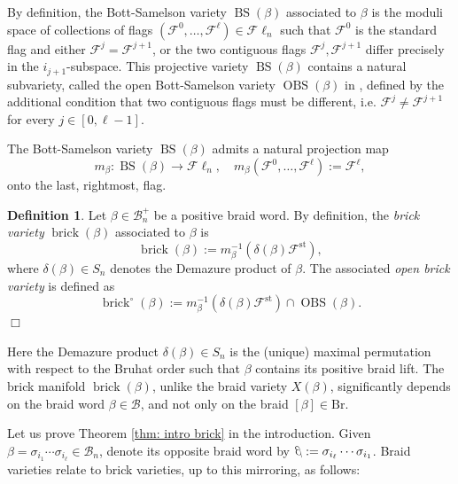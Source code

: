 \documentclass[10pt]{amsart}
\theoremstyle{plain}
\theoremstyle{definition}
\newtheorem{definition}[thm]{Definition}
\theoremstyle{remark}
\numberwithin{equation}{section}
\newcommand{\lr}{\longrightarrow}
\newcommand{\std}{\text{st}}
\newcommand{\cB}{\mathcal{B}}
\newcommand{\cF}{\mathscr{F}}
\newcommand{\Fl}{\mathscr{F}\ell}
\newcommand{\brick}{\operatorname{brick}}
\newcommand{\Br}{\mathrm{Br}}
\DeclareMathOperator{\BS}{BS}
\DeclareMathOperator{\OBS}{OBS}
\DeclareRobustCommand{\ateb}{\text{\reflectbox{$\beta$}}}
\begin{document}
By definition, the Bott-Samelson variety $\BS(\beta)$ associated to $\beta$ is the moduli space of collections of flags $(\cF^{0}, \dots, \cF^{\ell})\in\Fl_n$ such that $\cF^{0}$ is the standard flag and either $\cF^{j} = \cF^{j+1}$, or the two contiguous flags $\cF^{j},\cF^{j+1}$ differ precisely in the $i_{j+1}$-subspace. This projective variety $\BS(\beta)$ contains a natural subvariety, called the open Bott-Samelson variety $\OBS(\beta)$ in \cite{CGGS}, defined by the additional condition that two contiguous flags must be different, i.e. $\cF^{j} \neq \cF^{j+1}$ for every $j\in[0,\ell - 1]$.

\noindent The Bott-Samelson variety $\BS(\beta)$ admits a natural projection map
$$m_{\beta}: \BS(\beta) \lr \Fl_n,\quad m_{\beta}(\cF^{0}, \dots, \cF^{\ell}):= \cF^{\ell},$$
onto the last, rightmost, flag.

\begin{definition}
Let $\beta\in\cB_n^+$ be a positive braid word. By definition, the {\it brick variety} $\brick(\beta)$ associated to $\beta$ is
$$\brick(\beta) := m_{\beta}^{-1}(\delta(\beta)\cF^{\std}),$$
where $\delta(\beta)\in S_n$ denotes the Demazure product of $\beta$. The associated {\it open brick variety} is defined as
$$\brick^{\circ}(\beta) := m_{\beta}^{-1}(\delta(\beta)\cF^{\std})\cap \OBS(\beta).$$
\hfill$\Box$
\end{definition}

\noindent 
Here the Demazure product $\delta(\beta)\in S_n$ is the (unique) maximal permutation with respect to the Bruhat order such that $\beta$ contains its positive braid lift. The brick manifold $\brick(\beta)$, unlike the braid variety $X(\beta)$, significantly depends on the braid word $\beta\in\cB$, and not only on the braid $[\beta]\in\Br$. 

\noindent Let us prove Theorem \ref{thm: intro brick} in the introduction. Given $\beta = \sigma_{i_{1}}\cdots\sigma_{i_{\ell}}\in\cB_n$, denote its opposite braid word by $\ateb:= \sigma_{i_{\ell}}\cdots \sigma_{i_{1}}$. Braid varieties relate to brick varieties, up to this mirroring, as follows:
\end{document}
